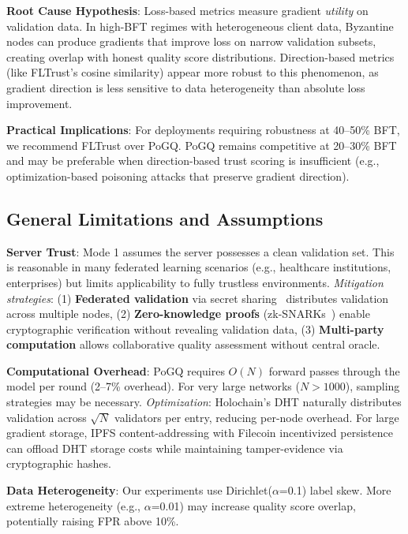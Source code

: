 \textbf{Root Cause Hypothesis}: Loss-based metrics measure gradient \emph{utility} on validation data. In high-BFT regimes with heterogeneous client data, Byzantine nodes can produce gradients that improve loss on narrow validation subsets, creating overlap with honest quality score distributions. Direction-based metrics (like FLTrust's cosine similarity) appear more robust to this phenomenon, as gradient direction is less sensitive to data heterogeneity than absolute loss improvement.

\textbf{Practical Implications}: For deployments requiring robustness at 40--50\% BFT, we recommend FLTrust over PoGQ. PoGQ remains competitive at 20--30\% BFT and may be preferable when direction-based trust scoring is insufficient (e.g., optimization-based poisoning attacks that preserve gradient direction).

\subsection{General Limitations and Assumptions}

\textbf{Server Trust}: Mode 1 assumes the server possesses a clean validation set. This is reasonable in many federated learning scenarios (e.g., healthcare institutions, enterprises) but limits applicability to fully trustless environments. \textit{Mitigation strategies}: (1) \textbf{Federated validation} via secret sharing~\cite{bonawitz2017practical} distributes validation across multiple nodes, (2) \textbf{Zero-knowledge proofs} (zk-SNARKs~\cite{bensasson2014succinct}) enable cryptographic verification without revealing validation data, (3) \textbf{Multi-party computation} allows collaborative quality assessment without central oracle.

\textbf{Computational Overhead}: PoGQ requires $O(N)$ forward passes through the model per round (2--7\% overhead). For very large networks ($N > 1000$), sampling strategies may be necessary. \textit{Optimization}: Holochain's DHT naturally distributes validation across $\sqrt{N}$ validators per entry, reducing per-node overhead. For large gradient storage, IPFS content-addressing with Filecoin incentivized persistence can offload DHT storage costs while maintaining tamper-evidence via cryptographic hashes.

\textbf{Data Heterogeneity}: Our experiments use Dirichlet($\alpha$=0.1) label skew. More extreme heterogeneity (e.g., $\alpha$=0.01) may increase quality score overlap, potentially raising FPR above 10\%.

